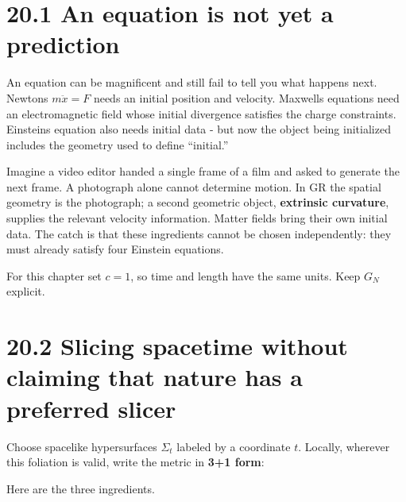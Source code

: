 \documentclass[
  11pt,
  letterpaper,
  oneside,
  openany]{scrbook}
\begin{document}
\hypertarget{an-equation-is-not-yet-a-prediction}{%
\section{20.1 An equation is not yet a
prediction}\label{an-equation-is-not-yet-a-prediction}}

An equation can be magnificent and still fail to tell you what happens
next. Newton\textquotesingle s \(m\ddot x=F\) needs an initial position
and velocity. Maxwell\textquotesingle s equations need an
electromagnetic field whose initial divergence satisfies the charge
constraints. Einstein\textquotesingle s equation also needs initial data
- but now the object being initialized includes the geometry used to
define ``initial.''

Imagine a video editor handed a single frame of a film and asked to
generate the next frame. A photograph alone cannot determine motion. In
GR the spatial geometry is the photograph; a second geometric object,
\textbf{extrinsic curvature}, supplies the relevant velocity
information. Matter fields bring their own initial data. The catch is
that these ingredients cannot be chosen independently: they must already
satisfy four Einstein equations.

For this chapter set \(c=1\), so time and length have the same units.
Keep \(G_N\) explicit.

\hypertarget{slicing-spacetime-without-claiming-that-nature-has-a-preferred-slicer}{%
\section{20.2 Slicing spacetime without claiming that nature has a
preferred
slicer}\label{slicing-spacetime-without-claiming-that-nature-has-a-preferred-slicer}}

Choose spacelike hypersurfaces \(\Sigma_t\) labeled by a coordinate
\(t\). Locally, wherever this foliation is valid, write the metric in
\textbf{3+1 form}:

\begin{center}
\begingroup
{}
\ifdim\wd\grmathbox>\linewidth
\resizebox{\linewidth}{!}{\usebox{\grmathbox}}
\else\usebox{\grmathbox}\fi
\endgroup
\end{center}

Here are the three ingredients.

\begingroup\small\setlength{\tabcolsep}{5pt}\renewcommand{\arraystretch}{1.13}
\end{document}
